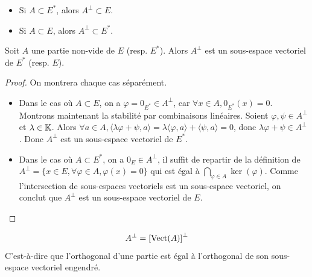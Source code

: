 \documentclass[11pt,a4paper]{report}
\begin{document}
\begin{remark}
    \begin{itemize}
        \item Si $A \subset E^*$, alors $A^\perp \subset E$.
        \item Si $A \subset E$, alors $A^\perp \subset E^*$.
    \end{itemize}
\end{remark}

\begin{proposition}
    Soit $A$ une partie non-vide de $E$ (resp. $E^*$). Alors $A^\perp$ est un sous-espace vectoriel de $E^*$ (resp. $E$).
\end{proposition}

\begin{proof}
    On montrera chaque cas séparément.
    \begin{itemize}
        \item Dans le cas où $A \subset E$, on a $\varphi = 0_{E^*} \in A^\perp$, car $\forall x \in A, 0_{E^*}(x) = 0$. Montrons maintenant la stabilité par combinaisons linéaires. Soient $\varphi,\psi \in A^\perp$ et $\lambda \in \mathbb{K}$. Alors $\forall a \in A, \langle \lambda \varphi + \psi, a \rangle = \lambda \langle \varphi, a \rangle + \langle \psi, a \rangle = 0$, donc $\lambda \varphi + \psi \in A^\perp$. Donc $A^\perp$ est un sous-espace vectoriel de $E^*$.
        \item Dans le cas où $A \subset E^*$, on a $0_E \in A^\perp$, il suffit de repartir de la définition de $A^\perp = \{x \in E, \forall \varphi \in A, \varphi(x) = 0\}$ qui est égal à $\bigcap_{\varphi \in A} \ker(\varphi)$. Comme l'intersection de sous-espaces vectoriels est un sous-espace vectoriel, on conclut que $A^\perp$ est un sous-espace vectoriel de $E$. 
    \end{itemize}
\end{proof}

\begin{proposition}
    $$A^\perp = \left[\mathrm{Vect}(A)\right]^\perp$$
    C'est-à-dire que l'orthogonal d'une partie est égal à l'orthogonal de son sous-espace vectoriel engendré.
\end{proposition}
\end{document}
